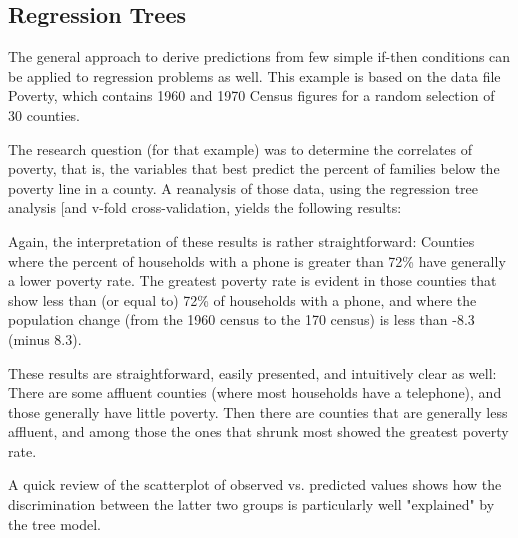 \documentclass[caret-main.tex]{subfiles}
\begin{document}
\subsection{Regression Trees}
The general approach to derive predictions from few simple if-then conditions can be applied to regression problems as well. This example is based on the data file Poverty, which contains 1960 and 1970 Census figures for a random selection of 30 counties. 

The research question (for that example) was to determine the correlates of poverty, that is, the variables that best predict the percent of families below the poverty line in a county. A reanalysis of those data, using the regression tree analysis [and v-fold cross-validation, yields the following results:


Again, the interpretation of these results is rather straightforward: Counties where the percent of households with a phone is greater than 72\% have generally a lower poverty rate. The greatest poverty rate is evident in those counties that show less than (or equal to) 72\% of households with a phone, and where the population change (from the 1960 census to the 170 census) is less than -8.3 (minus 8.3). 

These results are straightforward, easily presented, and intuitively clear as well: There are some affluent counties (where most households have a telephone), and those generally have little poverty. Then there are counties that are generally less affluent, and among those the ones that shrunk most showed the greatest poverty rate. 

A quick review of the scatterplot of observed vs. predicted values shows how the discrimination between the latter two groups is particularly well "explained" by the tree model.

\end{document}
